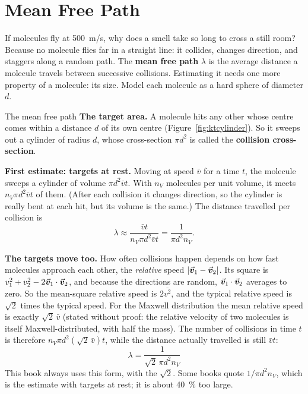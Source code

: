 \section{Mean Free Path}\label{sec:ktmfp}

If molecules fly at \SI{500}{m/s}, why does a smell take so long to cross a still room? Because no
molecule flies far in a straight line: it collides, changes direction, and staggers along a random path.
The \textbf{mean free path} $\lambda$ is the average distance a molecule travels between successive
collisions. Estimating it needs one more property of a molecule: its size. Model each molecule as a hard
sphere of diameter $d$.

\begin{figure}[htbp]
\centering
{}
\end{figure}

\begin{derivbox}{The mean free path}
 \textbf{The target area.} A molecule hits any other whose centre comes within a distance $d$ of
its own centre (Figure~\ref{fig:ktcylinder}). So it sweeps out a cylinder of radius $d$, whose cross-section $\pi d^2$ is called the \textbf{collision cross-section}.

 \textbf{First estimate: targets at rest.} Moving at speed $\bar v$ for a time $t$, the molecule
sweeps a cylinder of volume $\pi d^2\bar v t$. With $n_V$ molecules per unit volume, it meets
$n_V\pi d^2\bar v t$ of them. (After each collision it changes direction, so the cylinder is really
bent at each hit, but its volume is the same.) The distance travelled per collision is
\[
\lambda \approx \frac{\bar v t}{n_V\pi d^2 \bar v t} = \frac{1}{\pi d^2 n_V}.
\]

 \textbf{The targets move too.} How often collisions happen depends on how fast molecules
approach each other, the \emph{relative} speed $|\vec{\bm{v}}_1-\vec{\bm{v}}_2|$. Its square is
$v_1^2+v_2^2-2\vec{\bm{v}}_1\cdot\vec{\bm{v}}_2$, and because the directions are random, $\vec{\bm{v}}_1\cdot\vec{\bm{v}}_2$ averages to zero.
So the mean-square relative speed is $2\overline{v^2}$, and the typical relative speed is $\sqrt2$ times
the typical speed. For the Maxwell distribution the mean relative speed is exactly $\sqrt2\,\bar v$
(stated without proof: the relative velocity of two molecules is itself Maxwell-distributed, with half
the mass). The number of collisions in time $t$ is therefore $n_V\pi d^2(\sqrt2\,\bar v)t$, while the
distance actually travelled is still $\bar vt$:
\[
\boxed{\;\lambda = \frac{1}{\sqrt{2}\,\pi d^2 n_V}\;}
\]
This book always uses this form, with the $\sqrt2$. Some books quote $1/\pi d^2n_V$, which is the estimate
with targets at rest; it is about \SI{40}{\percent} too large.
\end{derivbox}

